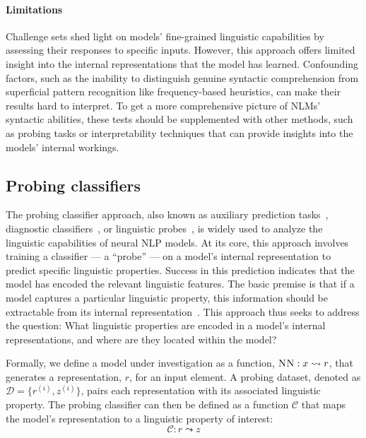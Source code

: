 \paragraph{Limitations} Challenge sets shed light on models' fine-grained linguistic capabilities by assessing their responses to specific inputs. However, this approach offers limited insight into the internal representations that the model has learned. Confounding factors, such as the inability to distinguish genuine syntactic comprehension from superficial pattern recognition like frequency-based heuristics, can make their results hard to interpret. To get a more comprehensive picture of NLMs' syntactic abilities, these tests should be supplemented with other methods, such as probing tasks or interpretability techniques that can provide insights into the models' internal workings.



\subsection{Probing classifiers} \label{sec:probing}
 The probing classifier approach, also known as auxiliary prediction tasks~\citep{adi2016fine}, diagnostic classifiers~\citep{veldhoen2016diagnostic}, or linguistic probes~\citep{zhu-rudzicz-2020-information}, 
 is widely used to analyze the linguistic capabilities of neural NLP models. At its core, this approach involves training a classifier --- a ``probe'' --- on a model's internal representation to predict specific linguistic properties. Success in this prediction indicates that the model has encoded the relevant linguistic features. The basic premise is that if a model captures a particular linguistic property, this information should be extractable from its internal representation~\citep{hupkes2018visualisation}. This approach thus seeks to address the question: What linguistic properties are encoded in a model's internal representations, and where are they located within the model?

Formally, we define a model under investigation as a function, $\textsc{NN}:x \leadsto r$, that generates a representation, $r$, for an input element. A probing dataset, denoted as $\mathcal{D} = \{r^{(i)}, z^{(i)}\}$, pairs each representation with its associated linguistic property. The probing classifier can then be defined as a function $\mathcal{C}$ that maps the model's representation to a linguistic property of interest: 
\begin{equation}
    \mathcal{C}: r \leadsto z
\end{equation}

